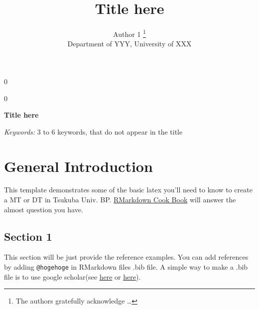 \documentclass[12pt, a4paper]{report} %
\newcommand{\blind}{0}
\begin{document}
\def\spacingset#1{\renewcommand{\baselinestretch}%
{#1}\small\normalsize} \spacingset{1}



\blind
{
  \title{\bf Title here}

  \author{
        Author 1 \thanks{The authors gratefully acknowledge \ldots{}} \\
    Department of YYY, University of XXX\\
      }
  \maketitle
} \fi

\blind
{
  \bigskip
  \bigskip
  \bigskip
  \begin{center}
    {\LARGE\bf Title here}
  \end{center}
  \medskip
} \fi

\bigskip
\begin{abstract}

\end{abstract}

\noindent%
{\it Keywords:} 3 to 6 keywords, that do not appear in the title
\vfill

\newpage
\spacingset{1.45} %

\chapter*{General Introduction}
 \parindent=5.3mm

This template demonstrates some of the basic latex you'll need to know
to create a MT or DT in Tsukuba Univ. BP.
\href{https://bookdown.org/yihui/rmarkdown-cookbook/}{RMarkdown Cook
Book} will answer the almost question you have.

\section{Section 1}
\label{Section1}

This section will be just provide the reference examples. You can add
references by adding \texttt{@hogehoge} in RMarkdown files .bib file. A
simple way to make a .bib file is to use google scholar(see
\href{https://digitalmeasures.oregonstate.edu/training/export-bibtex-google-scholar}{here}
or
\href{http://ajdkbsuvi.blogspot.com/2011/02/google-scholarbibtex.html}{here}).
\end{document}
